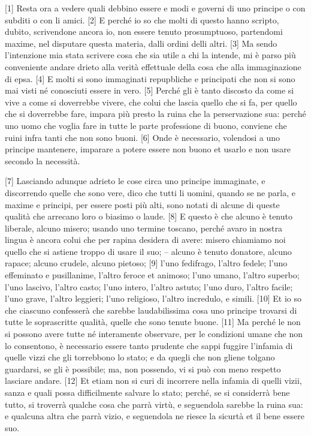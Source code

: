 {[}1{]} Resta ora a vedere quali debbino essere e modi e governi di uno
principe o con subditi o con li amici. {[}2{]} E perché io so che molti
di questo hanno scripto, dubito, scrivendone ancora io, non essere
tenuto prosumptuoso, partendomi maxime, nel disputare questa materia,
dalli ordini delli altri. {[}3{]} Ma sendo l'intenzione mia stata
scrivere cosa che sia utile a chi la intende, mi è parso più conveniente
andare drieto alla verità effettuale della cosa che alla immaginazione
di epsa. {[}4{]} E molti si sono immaginati repupbliche e principati che
non si sono mai visti né conosciuti essere in vero. {[}5{]} Perché gli è
tanto discosto da come si vive a come si doverrebbe vivere, che colui
che lascia quello che si fa, per quello che si doverrebbe fare, impara
più presto la ruina che la perservazione sua: perché uno uomo che voglia
fare in tutte le parte professione di buono, conviene che ruini infra
tanti che non sono buoni. {[}6{]} Onde è necessario, volendosi a uno
principe mantenere, imparare a potere essere non buono et usarlo e non
usare secondo la necessità.

{[}7{]} Lasciando adunque adrieto le cose circa uno principe immaginate,
e discorrendo quelle che sono vere, dico che tutti li uomini, quando se
ne parla, e maxime e principi, per essere posti più alti, sono notati di
alcune di queste qualità che arrecano loro o biasimo o laude. {[}8{]} E
questo è che alcuno è tenuto liberale, alcuno misero; usando uno termine
toscano, perché avaro in nostra lingua è ancora colui che per rapina
desidera di avere: misero chiamiamo noi quello che si astiene troppo di
usare il suo; -- alcuno è tenuto donatore, alcuno rapace; alcuno
crudele, alcuno pietoso; {[}9{]} l'uno fedifrago, l'altro fedele; l'uno
effeminato e pusillanime, l'altro feroce et animoso; l'uno umano,
l'altro superbo; l'uno lascivo, l'altro casto; l'uno intero, l'altro
astuto; l'uno duro, l'altro facile; l'uno grave, l'altro leggieri; l'uno
religioso, l'altro incredulo, e simili. {[}10{]} Et io so che ciascuno
confesserà che sarebbe laudabilissima cosa uno principe trovarsi di
tutte le soprascritte qualità, quelle che sono tenute buone. {[}11{]} Ma
perché le non si possono avere tutte né interamente observare, per le
condizioni umane che non lo consentono, è necessario essere tanto
prudente che sappi fuggire l'infamia di quelle vizzi che gli torrebbono
lo stato; e da quegli che non gliene tolgano guardarsi, se gli è
possibile; ma, non possendo, vi si può con meno respetto lasciare
andare. {[}12{]} Et etiam non si curi di incorrere nella infamia di
quelli vizii, sanza e quali possa difficilmente salvare lo stato;
perché, se si considerrà bene tutto, si troverrà qualche cosa che parrà
virtù, e seguendola sarebbe la ruina sua: e qualcuna altra che parrà
vizio, e seguendola ne riesce la sicurtà et il bene essere suo.


